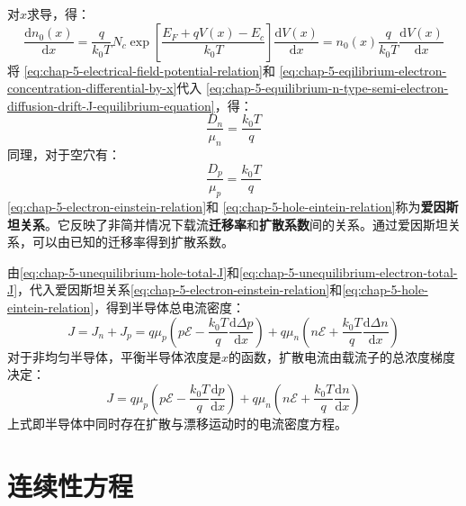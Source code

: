 对$x$求导，得：
\begin{equation}
    \frac{\mathrm{d}n_0(x)}{\mathrm{d}x}=\frac{q}{k_0T}N_c\exp{\left[\frac{E_F+qV(x)-E_c}{k_0T}\right]}\frac{\mathrm{d}V(x)}{\mathrm{d}x}=n_0(x)\frac{q}{k_0T}\frac{\mathrm{d}V(x)}{\mathrm{d}x}\label{eq:chap-5-eqilibrium-electron-concentration-differential-by-x}
\end{equation}
将 \autoref{eq:chap-5-electrical-field-potential-relation}和 \autoref{eq:chap-5-eqilibrium-electron-concentration-differential-by-x}代入 \autoref{eq:chap-5-equilibrium-n-type-semi-electron-diffusion-drift-J-equilibrium-equation}，得：
\begin{equation}
    \frac{D_n}{\mu_n}=\frac{k_0T}{q}\label{eq:chap-5-electron-einstein-relation}
\end{equation}
同理，对于空穴有：
\begin{equation}
    \frac{D_p}{\mu_p}=\frac{k_0T}{q}\label{eq:chap-5-hole-eintein-relation}
\end{equation}
\autoref{eq:chap-5-electron-einstein-relation}和 \autoref{eq:chap-5-hole-eintein-relation}称为\textbf{爱因斯坦关系}。它反映了非简并情况下载流\textbf{迁移率}和\textbf{扩散系数}间的关系。通过爱因斯坦关系，可以由已知的迁移率得到扩散系数。

由\autoref{eq:chap-5-unequilibrium-hole-total-J}和\autoref{eq:chap-5-unequilibrium-electron-total-J}，代入爱因斯坦关系\autoref{eq:chap-5-electron-einstein-relation}和\autoref{eq:chap-5-hole-eintein-relation}，得到半导体总电流密度：
\begin{equation}
    J=J_n+J_p=q\mu_p\left(p\mathscr{E}-\frac{k_0T}{q}\frac{\mathrm{d}\Delta p}{\mathrm{d}x}\right)+q\mu_n\left(n\mathscr{E}+\frac{k_0T}{q}\frac{\mathrm{d}\Delta n}{\mathrm{d}x}\right)
\end{equation}
对于非均匀半导体，平衡半导体浓度是$x$的函数，扩散电流由载流子的总浓度梯度决定：
\begin{equation}
    J=q\mu_p\left(p\mathscr{E}-\frac{k_0T}{q}\frac{\mathrm{d}p}{\mathrm{d}x}\right)+q\mu_n\left(n\mathscr{E}+\frac{k_0T}{q}\frac{\mathrm{d}n}{\mathrm{d}x}\right)
\end{equation}
上式即半导体中同时存在扩散与漂移运动时的电流密度方程。

\section{连续性方程}

